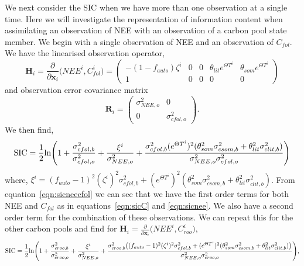 \documentclass[11pt]{article}
\begin{document}
We next consider the SIC when we have more than one observation at a single time. Here we will investigate the representation of information content when assimilating an observation of NEE with an observation of a carbon pool state member. We begin with a single observation of NEE and an observation of \(C_{fol}\). We have the linearised observation operator,
\begin{equation}
\textbf{H}_{i} = \frac{\partial}{\partial \textbf{x}_{i}}\big(NEE^{i}, C_{fol}^{i} \big) =
 \begin{pmatrix}
-(1-f_{auto})\zeta^i & 0 & 0 & \theta_{lit} e^{\Theta T^{i}} & \theta_{som} e^{\Theta T^{i}}\\
1 & 0 & 0 & 0 & 0
\end{pmatrix}
\end{equation}
and observation error covariance matrix
\begin{equation}
\mathbf{R}_i = \begin{pmatrix}
\sigma_{NEE,o}^{2} & 0 \\
0 & \sigma_{cfol,o}^{2}
\end{pmatrix}.
\end{equation}
We then find,
\begin{equation}
\text{SIC} = \frac{1}{2}\text{ln} \Bigg( 1 + \frac{\sigma_{cfol,b}^{2}}{\sigma_{cfol,o}^{2}} + \frac{\xi^{i}}{\sigma_{NEE,o}^{2}} + \\
 \frac{\sigma_{cfol,b}^{2}(e^{\Theta T^{i}})^2(\theta_{som}^2\sigma_{csom,b}^2+\theta_{lit}^2\sigma_{clit,b}^2)}{\sigma_{NEE,o}^{2}\sigma_{cfol,o}^{2}} \Bigg) \label{eqn:sicneecfol}
 \end{equation}
 where, \( \xi^{i} = (f_{auto}-1)^{2}(\zeta^{i})^{2}\sigma_{cfol,b}^{2} + (e^{\Theta T^{i}})^2(\theta_{som}^2\sigma_{csom,b}^2+\theta_{lit}^2\sigma_{clit,b}^2) \). From equation~\eqref{eqn:sicneecfol} we can see that we have the first order terms for both NEE and \(C_{fol}\) as in equations~\eqref{eqn:sicC} and \eqref{eqn:sicnee}. We also have a second order term for the combination of these observations. We can repeat this for the other carbon pools and find for \(\textbf{H}_{i} = \frac{\partial}{\partial \textbf{x}_{i}}\big(NEE^{i}, C_{roo}^{i} \big) \),
\begin{equation}
\text{SIC} = \frac{1}{2}\text{ln} \Bigg( 1 + \frac{\sigma_{croo,b}^{2}}{\sigma_{croo,o}^{2}} + \frac{\xi^{i}}{\sigma_{NEE,o}^{2}} + \\
 \frac{\sigma_{croo,b}^{2}\big((f_{auto}-1)^{2}(\zeta^{i})^{2}\sigma_{cfol,b}^{2} + (e^{\Theta T^{i}})^2(\theta_{som}^2\sigma_{csom,b}^2+\theta_{lit}^2\sigma_{clit,b}^2)\big)}{\sigma_{NEE,o}^{2}\sigma_{croo,o}^{2}} \Bigg), \label{eqn:sicneecroo}
 \end{equation} 
\end{document}

